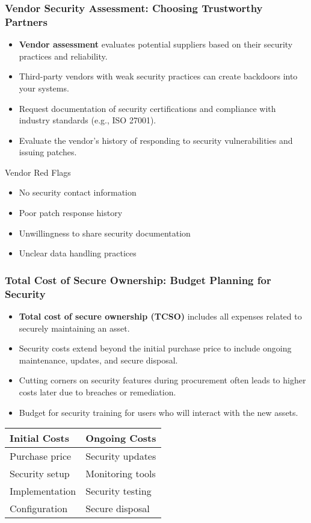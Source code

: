 \documentclass{beamer}
\begin{document}
\begin{frame}
\frametitle{Vendor Security Assessment: Choosing Trustworthy Partners}
\begin{itemize}
\item \textbf{Vendor assessment} evaluates potential suppliers based on their security practices and reliability.
\item Third-party vendors with weak security practices can create backdoors into your systems.
\item Request documentation of security certifications and compliance with industry standards (e.g., ISO 27001).
\item Evaluate the vendor's history of responding to security vulnerabilities and issuing patches.
\end{itemize}

\begin{exampleblock}{Vendor Red Flags}
\begin{itemize}
\item No security contact information
\item Poor patch response history
\item Unwillingness to share security documentation
\item Unclear data handling practices
\end{itemize}
\end{exampleblock}
\end{frame}

\begin{frame}
\frametitle{Total Cost of Secure Ownership: Budget Planning for Security}
\begin{itemize}
\item \textbf{Total cost of secure ownership (TCSO)} includes all expenses related to securely maintaining an asset.
\item Security costs extend beyond the initial purchase price to include ongoing maintenance, updates, and secure disposal.
\item Cutting corners on security features during procurement often leads to higher costs later due to breaches or remediation.
\item Budget for security training for users who will interact with the new assets.
\end{itemize}

\begin{table}
    \small
\begin{tabular}{|l|l|}
\hline
\textbf{Initial Costs} & \textbf{Ongoing Costs} \\
\hline
Purchase price & Security updates \\
Security setup & Monitoring tools \\
Implementation & Security testing \\
Configuration & Secure disposal \\
\hline
\end{tabular}
\end{table}
\end{frame}
\end{document}
